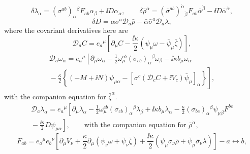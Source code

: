 \begin{equation}
  \delta\lambda_\alpha
  =(\sigma^{ab})_\alpha{}^\beta F_{ab}\alpha_\beta
   +\ii D\alpha_\alpha,
  \qquad
  \delta\bar\rho^{\dot\alpha}
  =(\bar\sigma^{ab})^{\dot\alpha}{}_{\dot\beta}
    F_{ab}\bar\alpha^{\dot\beta}
   -\ii D\bar\alpha^{\dot\alpha},
  \tag{31.6.17}\label{eq:31.6.17}
\end{equation}
\begin{equation}
  \delta D
  =\alpha\sigma^a\mathcal D_a\bar\rho
   -\bar\alpha\bar\sigma^a\mathcal D_a\lambda,
  \tag{31.6.18}\label{eq:31.6.18}
\end{equation}
where the covariant derivatives here are
\begin{equation}
  \mathcal D_aC
  =e_a{}^\mu\left[
    \partial_\mu C-\frac{\ii\kappa}{2}
    \left(\psi_\mu\omega-\bar\psi_\mu\bar\zeta\right)
  \right],
  \tag{31.6.19}\label{eq:31.6.19}
\end{equation}
\begin{multline}
  \mathcal D_a\omega_\alpha
  =e_a{}^\mu\left[
    \partial_\mu\omega_\alpha
    -\frac12\omega_\mu^{cb}
      (\sigma_{cb})_\alpha{}^\beta\omega_\beta
    -\ii\kappa b_\mu\omega_\alpha\right.\\
  \left.
    {}-\frac{\kappa}{2}
      \left\{
        (-M+\ii N)\psi_{\mu\alpha}
        -\left[\sigma^c(\mathcal D_cC+\ii V_c)
         \bar\psi_\mu\right]_\alpha
      \right\}
  \right],
  \tag{31.6.20}\label{eq:31.6.20}
\end{multline}
with the companion equation for \(\bar\zeta^{\dot\alpha}\).
\begin{multline}
  \mathcal D_a\lambda_\alpha
  =e_a{}^\mu\left[
    \partial_\mu\lambda_\alpha
    -\frac12\omega_\mu^{cb}
      (\sigma_{cb})_\alpha{}^\beta\lambda_\beta
    +\ii\kappa b_\mu\lambda_\alpha
    -\frac{\kappa}{2}
      (\sigma_{bc})_\alpha{}^\beta\psi_{\mu\beta}F^{bc}\right.\\
  \left.
    {}-\frac{\ii\kappa}{2}D\psi_{\mu\alpha}
  \right],
  \qquad\text{with the companion equation for }\bar\rho^{\dot\alpha},
  \tag{31.6.21}\label{eq:31.6.21}
\end{multline}
\begin{equation}
  F_{ab}
  =e_a{}^\mu e_b{}^\nu\left[
    \partial_\mu V_\nu
    +\frac{\kappa}{2}\partial_\mu
      (\psi_\nu\omega+\bar\psi_\nu\bar\zeta)
    +\frac{\ii\kappa}{2}\left(
      \psi_\mu\sigma_\nu\bar\rho
      +\bar\psi_\mu\bar\sigma_\nu\lambda\right)
  \right]-a\leftrightarrow b,
  \tag{31.6.22}\label{eq:31.6.22}
\end{equation}
